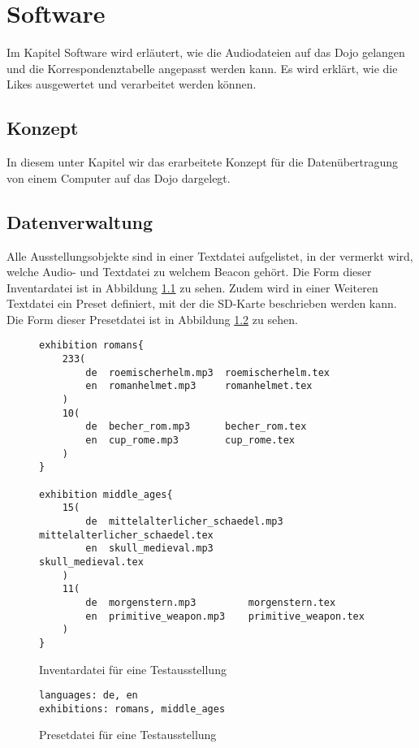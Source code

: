 \chapter{Software}
\thispagestyle{fancy} 
Im Kapitel Software wird erläutert, wie die Audiodateien auf das Dojo gelangen und die Korrespondenztabelle angepasst werden kann. Es wird erklärt, wie die Likes ausgewertet und verarbeitet werden können.
\section{Konzept}
In diesem unter Kapitel wir das erarbeitete Konzept für die Datenübertragung von einem Computer auf das Dojo dargelegt.

\section{Datenverwaltung}
Alle Ausstellungsobjekte sind in einer Textdatei aufgelistet, in der vermerkt wird, welche Audio- und Textdatei zu welchem Beacon gehört.
Die Form dieser Inventardatei ist in Abbildung \ref{inventory_syntax} zu sehen.
Zudem wird in einer Weiteren Textdatei ein Preset definiert, mit der die SD-Karte beschrieben werden kann.
Die Form dieser Presetdatei ist in Abbildung \ref{preset_syntax} zu sehen.

\begin{figure}
	\begin{verbatim}
exhibition romans{
    233(
        de  roemischerhelm.mp3  roemischerhelm.tex
        en  romanhelmet.mp3     romanhelmet.tex
    )
    10(
        de  becher_rom.mp3      becher_rom.tex
        en  cup_rome.mp3        cup_rome.tex
    )
}

exhibition middle_ages{
    15(
        de  mittelalterlicher_schaedel.mp3  mittelalterlicher_schaedel.tex
        en  skull_medieval.mp3              skull_medieval.tex
    )
    11(
        de  morgenstern.mp3         morgenstern.tex
        en  primitive_weapon.mp3    primitive_weapon.tex
    )
}
	\end{verbatim}
	\caption{Inventardatei für eine Testausstellung}
	\label{inventory_syntax}
\end{figure}

\begin{figure}
	\begin{verbatim}
languages: de, en
exhibitions: romans, middle_ages
	\end{verbatim}
	\caption{Presetdatei für eine Testausstellung}
	\label{preset_syntax}
\end{figure}


